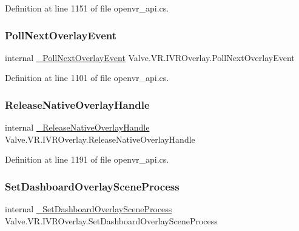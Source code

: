 Definition at line 1151 of file openvr\+\_\+api.\+cs.

\mbox{\label{struct_valve_1_1_v_r_1_1_i_v_r_overlay_ae0ce46af1422a40dfc7d97c2e36d5bb3}} 
\subsubsection{\texorpdfstring{PollNextOverlayEvent}{PollNextOverlayEvent}}
{\footnotesize\ttfamily internal \mbox{\hyperlink{struct_valve_1_1_v_r_1_1_i_v_r_overlay_aff9a0bf6a3969b29ae3af67dc6991c28}{\+\_\+\+Poll\+Next\+Overlay\+Event}} Valve.\+V\+R.\+I\+V\+R\+Overlay.\+Poll\+Next\+Overlay\+Event}



Definition at line 1101 of file openvr\+\_\+api.\+cs.

\mbox{\label{struct_valve_1_1_v_r_1_1_i_v_r_overlay_ab65e5ce74ba85d1476b32bd98c08ccbc}} 
\subsubsection{\texorpdfstring{ReleaseNativeOverlayHandle}{ReleaseNativeOverlayHandle}}
{\footnotesize\ttfamily internal \mbox{\hyperlink{struct_valve_1_1_v_r_1_1_i_v_r_overlay_a688ff280dfb7e1797a832b5e26ae7dc2}{\+\_\+\+Release\+Native\+Overlay\+Handle}} Valve.\+V\+R.\+I\+V\+R\+Overlay.\+Release\+Native\+Overlay\+Handle}



Definition at line 1191 of file openvr\+\_\+api.\+cs.

\mbox{\label{struct_valve_1_1_v_r_1_1_i_v_r_overlay_a684f451ae8b526493da2dba3c474dc59}} 
\subsubsection{\texorpdfstring{SetDashboardOverlaySceneProcess}{SetDashboardOverlaySceneProcess}}
{\footnotesize\ttfamily internal \mbox{\hyperlink{struct_valve_1_1_v_r_1_1_i_v_r_overlay_ad5f215941b5872353dd95bf1b24fad09}{\+\_\+\+Set\+Dashboard\+Overlay\+Scene\+Process}} Valve.\+V\+R.\+I\+V\+R\+Overlay.\+Set\+Dashboard\+Overlay\+Scene\+Process}



